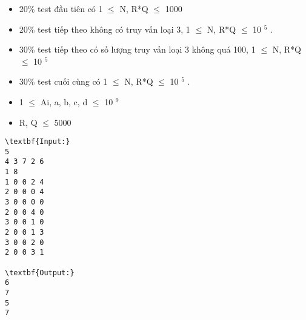 \begin{itemize}
	\item 20\% test đầu tiên có 1  $\le$  N, R*Q  $\le$  1000
	\item 20\% test tiếp theo không có truy vấn loại 3, 1  $\le$  N, R*Q  $\le$  10 $^ 5 $ .
	\item 30\% test tiếp theo có số lượng truy vấn loại 3 không quá 100, 1  $\le$  N, R*Q  $\le$  10 $^ 5 $
	\item 30\% test cuối cùng có 1  $\le$  N, R*Q  $\le$  10 $^ 5 $ .
	\item 1  $\le$  Ai, a, b, c, d  $\le$  10 $^ 9 $
	\item R, Q  $\le$  5000
\end{itemize}
\begin{verbatim}
\textbf{Input:}
5
4 3 7 2 6
1 8
1 0 0 2 4
2 0 0 0 4
3 0 0 0 0
2 0 0 4 0
3 0 0 1 0
2 0 0 1 3
3 0 0 2 0
2 0 0 3 1

\textbf{Output:}
6
7
5
7
\end{verbatim}